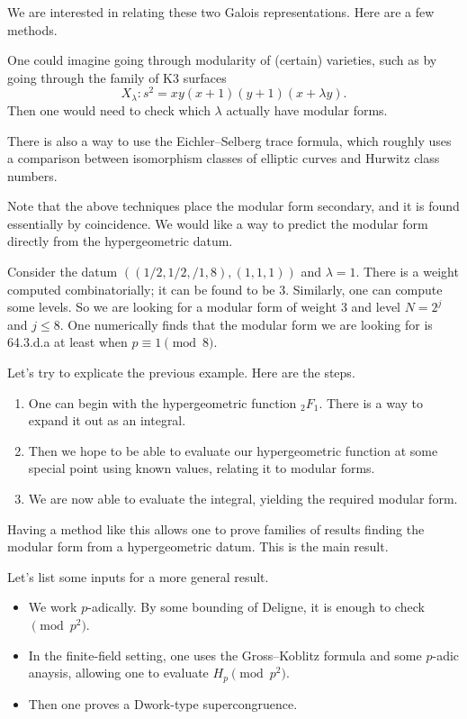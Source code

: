 \documentclass{article}
\begin{document}
We are interested in relating these two Galois representations. Here are a few methods.
\begin{example}
	One could imagine going through modularity of (certain) varieties, such as by going through the family of K3 surfaces
	\[X_\lambda\colon s^2=xy(x+1)(y+1)(x+\lambda y).\]
	Then one would need to check which $\lambda$ actually have modular forms. 
\end{example}
\begin{example}
	There is also a way to use the Eichler--Selberg trace formula, which roughly uses a comparison between isomorphism classes of elliptic curves and Hurwitz class numbers.
\end{example}
Note that the above techniques place the modular form secondary, and it is found essentially by coincidence. We would like a way to predict the modular form directly from the hypergeometric datum.
\begin{example}
	Consider the datum $((1/2,1/2,/1,8),(1,1,1))$ and $\lambda=1$. There is a weight computed combinatorially; it can be found to be $3$. Similarly, one can compute some levels. So we are looking for a modular form of weight $3$ and level $N=2^j$ and $j\le8$. One numerically finds that the modular form we are looking for is 64.3.d.a at least when $p\equiv1\pmod8$.
\end{example}
Let's try to explicate the previous example. Here are the steps.
\begin{enumerate}
	\item One can begin with the hypergeometric function $_2F_1$. There is a way to expand it out as an integral.
	\item Then we hope to be able to evaluate our hypergeometric function at some special point using known values, relating it to modular forms.
	\item We are now able to evaluate the integral, yielding the required modular form.
\end{enumerate}
Having a method like this allows one to prove families of results finding the modular form from a hypergeometric datum. This is the main result.

Let's list some inputs for a more general result.
\begin{itemize}
	\item We work $p$-adically. By some bounding of Deligne, it is enough to check$\pmod{p^2}$.
	\item In the finite-field setting, one uses the Gross--Koblitz formula and some $p$-adic anaysis, allowing one to evaluate $H_p\pmod{p^2}$.
	\item Then one proves a Dwork-type supercongruence.
\end{itemize}
\end{document}
